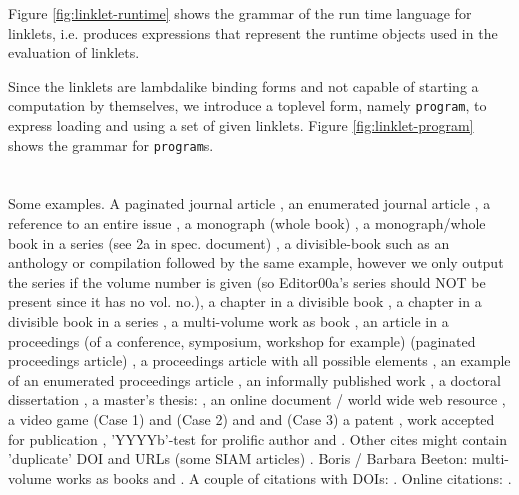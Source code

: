 \documentclass[sigplan,screen,anonymous]{acmart}
\def\dash {\text{-}}
\begin{document}
Figure \ref{fig:linklet-runtime} shows the grammar of the run\dash
time language for linklets, i.e. produces expressions that represent
the run\dash time objects used in the evaluation of linklets.

Since the linklets are lambda\dash like binding forms and not capable
of starting a computation by themselves, we introduce a top\dash level
form, namely \verb|program|, to express loading and using a set of
given linklets. Figure \ref{fig:linklet-program} shows the grammar for
\verb|program|s. 

\newpage
\section{}
Some examples.  A paginated journal article \cite{Abril07}, an enumerated journal article \cite{Cohen07}, a reference to an entire issue \cite{JCohen96}, a monograph (whole book) \cite{Kosiur01}, a monograph/whole book in a series (see 2a in spec. document)
\cite{Harel79}, a divisible-book such as an anthology or compilation \cite{Editor00} followed by the same example, however we only output the series if the volume number is given \cite{Editor00a} (so Editor00a's series should NOT be present since it has no vol. no.),
a chapter in a divisible book \cite{Spector90}, a chapter in a divisible book in a series \cite{Douglass98}, a multi-volume work as book \cite{Knuth97}, an article in a proceedings (of a conference, symposium, workshop for example) (paginated proceedings article) \cite{Andler79}, a proceedings article with all possible elements \cite{Smith10}, an example of an enumerated proceedings article \cite{VanGundy07}, an informally published work \cite{Harel78}, a doctoral dissertation \cite{Clarkson85}, a master's thesis: \cite{anisi03}, an online document / world wide web resource \cite{Thornburg01, Ablamowicz07, Poker06}, a video game (Case 1) \cite{Obama08} and (Case 2) \cite{Novak03} and \cite{Lee05} and (Case 3) a patent \cite{JoeScientist001}, work accepted for publication \cite{rous08}, 'YYYYb'-test for prolific author \cite{SaeediMEJ10} and \cite{SaeediJETC10}. Other cites might contain 'duplicate' DOI and URLs (some SIAM articles) \cite{Kirschmer:2010:AEI:1958016.1958018}. Boris / Barbara Beeton: multi-volume works as books \cite{MR781536} and \cite{MR781537}. A couple of citations with DOIs: \cite{2004:ITE:1009386.1010128,Kirschmer:2010:AEI:1958016.1958018}. Online citations: \cite{TUGInstmem, Thornburg01, CTANacmart}.

%

%



%
\end{document}
